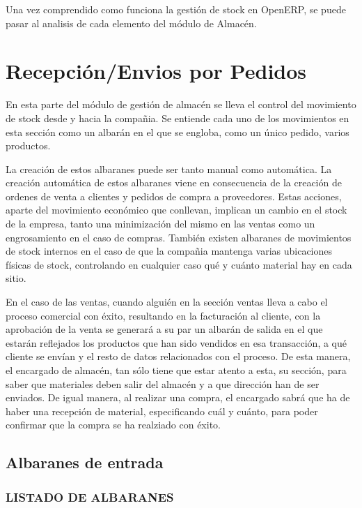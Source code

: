 Una vez comprendido como funciona la gestión de stock en OpenERP, se puede pasar al analisis de cada elemento del módulo de Almacén.


\section{Recepción/Envios por Pedidos}
En esta parte del módulo de gestión de almacén se lleva el control del movimiento de stock desde y hacia la compañia. Se entiende cada uno de los movimientos en esta sección como un albarán en el que se engloba, como un único pedido, varios productos.

La creación de estos albaranes puede ser tanto manual como automática. La creación automática de estos albaranes viene en consecuencia de la creación de ordenes de venta a clientes y pedidos de compra a proveedores. Estas acciones, aparte del movimiento económico que conllevan, implican un cambio en el stock de la empresa, tanto una minimización del mismo en las ventas como un engrosamiento en el caso de compras. También existen albaranes de movimientos de stock internos en el caso de que la compañia mantenga varias ubicaciones físicas de stock, controlando en cualquier caso qué y cuánto material hay en cada sitio.

En el caso de las ventas, cuando alguién en la sección ventas lleva a cabo el proceso comercial con éxito, resultando en la facturación al cliente, con la aprobación de la venta se generará a su par un albarán de salida en el que estarán reflejados los productos que han sido vendidos en esa transacción, a qué cliente se envían y el resto de datos relacionados con el proceso. De esta manera, el encargado de almacén, tan sólo tiene que estar atento a esta, su sección, para saber que materiales deben salir del almacén y a que dirección han de ser enviados. De igual manera, al realizar una compra, el encargado sabrá que ha de haber una recepción de material, especificando cuál y cuánto, para poder confirmar que la compra se ha realziado con éxito.



\subsection{Albaranes de entrada}
\subsubsection{LISTADO DE ALBARANES}

